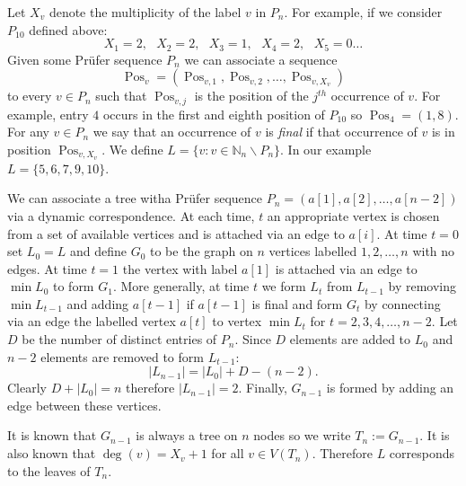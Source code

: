 \documentclass[10pt]{article} %
\theoremstyle{definition}
\DeclareMathOperator{\Pos}{Pos}
\begin{document}
Let $X_{v}$ denote the multiplicity of the label $v$ in $P_{n}$.  For example, if we consider $P_{10}$ defined above: 
\[X_{1}=2,\text{  } X_{2}=2,\text{  } X_{3}=1,\text{   } X_{4} = 2, \text{   } X_{5} = 0 \dots\]
Given some Pr\"{u}fer sequence $P_{n}$ we can associate  a sequence 
\[\Pos_{v} = (\Pos_{v,1},\Pos_{v,2},\dots,\Pos_{v,X_{v}})\]
to every $v \in P_{n}$ such that $\Pos_{v,j}$ is the position of the $j^{th}$ occurrence of $v$. For example, entry $4$ occurs in the first and eighth position of $P_{10}$ so $\Pos_{4} = (1,8)$.  For any $v \in P_{n}$ we say that an occurrence of $v$ is \emph{final} if that occurrence of $v$ is in position $\Pos_{v,X_{v}}$. We define $L = \{ v : v \in \mathbb{N}_{n} \backslash P_{n}\}$. In our example $L = \{5,6,7,9,10\}$.

We can associate a tree witha Pr\"{u}fer sequence $P_{n} = (a[1],a[2],\dots,a[n-2])$ via a dynamic correspondence. At each time, $t$ an appropriate vertex is chosen from a set of available vertices and is attached via an edge to $a[i]$.   At time $t = 0$ set $L_{0} = L$ and define $G_{0}$ to be the graph on $n$ vertices labelled $1,2,\dots,n$ with no edges. At time $t=1$ the vertex with label $a[1]$ is attached via an edge to $\min L_{0}$ to form $G_{1}$.  More generally, at time $t$ we form $L_{t}$ from $L_{t-1}$ by removing $\min L_{t-1}$ and adding $a[t-1]$ if $a[t-1]$ is final and form $G_{t}$ by connecting via an edge the labelled vertex $a[t]$ to vertex $\min L_{t}$ for $t = 2,3,4,\dots,n-2$.  Let $D$ be the number of distinct entries of $P_{n}$. Since $D$ elements are added to $L_{0}$ and $n-2$ elements are removed to form $L_{t-1}$:
\[|L_{n-1}| = |L_{0}| + D - (n-2).\]
Clearly $D + |L_{0}| = n$ therefore $|L_{n-1}| = 2$. Finally, $G_{n-1}$ is formed by adding an edge between these vertices.

It is known that $G_{n-1}$ is always a tree on $n$ nodes so we write $T_{n}:=G_{n-1}$.  It is also known that $\deg(v) = X_{v} + 1$ for all $v \in V(T_{n})$. Therefore $L$ corresponds to the leaves of $T_{n}$.  %
\end{document}
